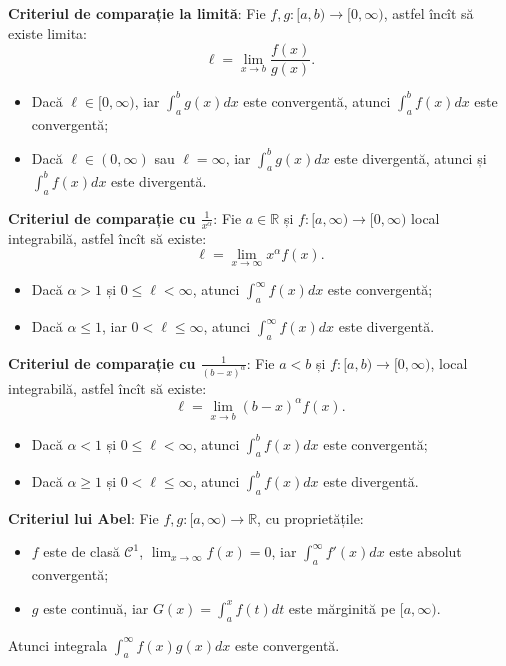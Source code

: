 \documentclass[11pt,a4paper]{article}
\newcommand\kal{\mathcal}
\newcommand\ds{\displaystyle}
\newcommand\RR{\mathbb{R}}
\theoremstyle{dotless}
\theoremstyle{dotlessdr}
\begin{document}
\textbf{Criteriul de comparație la limită}: Fie $f, g : [a, b) \to [0, \infty)$,
astfel încît să existe limita:
\[
  \ell = \lim_{x \to b} \frac{f(x)}{g(x)}.
\]
\begin{itemize}
\item Dacă $\ell \in [0, \infty)$, iar $\ds\int_a^b g(x) dx$ este convergentă,
  atunci $\ds\int_a^b f(x) dx$ este convergentă;
\item Dacă $\ell \in (0, \infty)$ sau $\ell = \infty$, iar $\ds\int_a^b g(x) dx$
  este divergentă, atunci și $\ds\int_a^b f(x) dx$ este divergentă.
\end{itemize}

\vspace{1cm}

\textbf{Criteriul de comparație cu $\frac{1}{x^\alpha}$}:
Fie $a \in \RR$ și $f : [a, \infty) \to [0, \infty)$ local integrabilă, astfel
încît să existe:
\[
  \ell = \lim_{x \to \infty} x^\alpha f(x).
\]
\begin{itemize}
\item Dacă $\alpha > 1$ și $0 \leq \ell < \infty$, atunci $\ds\int_a^\infty f(x) dx$
  este convergentă;
\item Dacă $\alpha \leq 1$, iar $0 < \ell \leq \infty$, atunci $\ds\int_a^\infty f(x) dx$
  este divergentă.
\end{itemize}

\vspace{1cm}

\textbf{Criteriul de comparație cu $\frac{1}{(b - x)^\alpha}$}: Fie $a < b$ și
$f : [a, b) \to [0, \infty)$, local integrabilă, astfel încît să existe:
\[
  \ell = \lim_{x \to b} (b - x)^\alpha f(x).
\]
\begin{itemize}
\item Dacă $\alpha < 1$ și $0 \leq \ell < \infty$, atunci $\ds\int_a^b f(x) dx$
  este convergentă;
\item Dacă $\alpha \geq 1$ și $0 < \ell \leq \infty$, atunci $\ds\int_a^b f(x) dx$
  este divergentă.
\end{itemize}

\vspace{1cm}

\textbf{Criteriul lui Abel}: Fie $f, g : [a, \infty) \to \RR$, cu proprietățile:
\begin{itemize}
\item $f$ este de clasă $\kal{C}^1$, $\ds\lim_{x \to \infty} f(x) = 0$, iar
  $\ds\int_a^\infty f'(x) dx$ este absolut convergentă;
\item $g$ este continuă, iar $G(x) = \ds\int_a^x f(t) dt$ este mărginită pe
  $[a, \infty)$.
\end{itemize}
Atunci integrala $\ds\int_a^\infty f(x) g(x) dx$ este convergentă.
\end{document}

